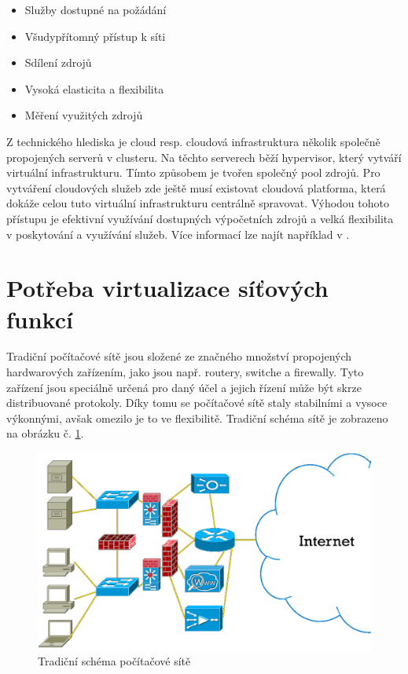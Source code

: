 \begin{itemize}
\item Služby dostupné na požádání
\item Všudypřítomný přístup k síti
\item Sdílení zdrojů
\item Vysoká elasticita a flexibilita
\item Měření využitých zdrojů
\end{itemize}

Z technického hlediska je cloud resp. cloudová infrastruktura několik společně propojených serverů v clusteru. Na těchto serverech běží hypervisor, který vytváří virtuální infrastrukturu. Tímto způsobem je tvořen společný pool zdrojů. Pro vytváření cloudových služeb zde ještě musí existovat cloudová platforma, která dokáže celou tuto virtuální infrastrukturu centrálně spravovat. Výhodou tohoto přístupu je efektivní využívání dostupných výpočetních zdrojů a velká flexibilita v poskytování a využívání služeb. Více informací lze najít například v \cite{cloud_book}.

\section{Potřeba virtualizace síťových funkcí}

Tradiční počítačové sítě jsou složené ze značného množství propojených hardwarových zařízením, jako jsou např. routery, switche a firewally. Tyto zařízení jsou speciálně určená pro daný účel a jejich řízení může být skrze distribuované protokoly. Díky tomu se počítačové sítě staly stabilními a vysoce výkonnými, avšak omezilo je to ve flexibilitě. Tradiční schéma sítě je zobrazeno na obrázku č. \ref{fig:network}.

\begin{figure}[h]
\begin{centering}
\includegraphics[scale=0.30]{images/network}
\par\end{centering}
\caption{Tradiční schéma počítačové sítě} \label{fig:network}
\end{figure}

